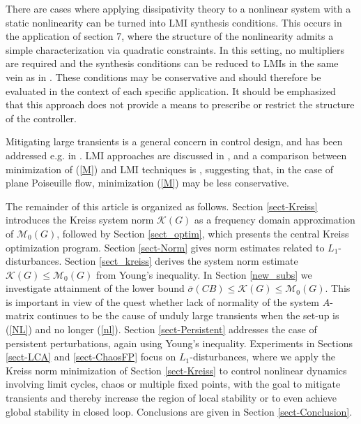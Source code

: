 \documentclass[12pt, a4paper,reqno]{amsart}
\theoremstyle{definition}
\begin{document}
There are cases where applying dissipativity theory to a nonlinear system with a static nonlinearity can be turned into LMI synthesis conditions. This occurs in the application of section 7, where the structure of the nonlinearity admits a simple characterization via quadratic constraints. In this setting, no multipliers are required and the synthesis conditions can be reduced to LMIs in the same vein as in \cite{kalur2021nonlinear,mushtaq2022feedback}. These conditions may be conservative and should therefore be evaluated in the context of each specific application. It should be emphasized that this approach does not provide a means to prescribe or restrict the structure of the controller.

Mitigating large  transients is a general concern in control design, and has been addressed e.g. in
\cite{astolfi22,whidborne2007minimization,MQMcW2011,ray21}. 
LMI approaches are discussed in \cite{boyd1994linear, whidborne2005minimization}, and  a 
comparison between minimization of (\ref{M})  and LMI techniques is \cite{quenon2021control}, suggesting that, in the case of plane Poiseuille flow, minimization (\ref{M}) may be less conservative. 





The remainder of this article is organized as follows. Section \ref{sect-Kreiss} introduces 
the Kreiss system norm $\mathcal K(G)$ as a frequency domain approximation
of $\mathcal M_0(G)$, followed by Section \ref{sect_optim}, which presents the central
Kreiss optimization program.
Section \ref{sect-Norm}  gives norm estimates related to $L_1$-disturbances. Section \ref{sect_kreiss} derives 
the system norm estimate $\mathcal K(G) \leq \mathcal M_0(G)$ from Young's inequality.
In Section \ref{new_subs} we investigate attainment of the lower bound $\overline{\sigma}(CB) \leq \mathcal K(G)\leq \mathcal M_0(G)$. This is important in view of the quest whether
lack of normality of the system $A$-matrix continues to be the cause of unduly
large transients when the set-up is (\ref{NL}) and no longer (\ref{nl}).
Section \ref{sect-Persistent} addresses the case of persistent perturbations, again using Young's inequality. Experiments
in Sections \ref{sect-LCA} and \ref{sect-ChaosFP} focus on $L_1$-disturbances, where we apply the Kreiss norm
minimization  of Section \ref{sect-Kreiss}  to control nonlinear dynamics involving limit cycles, chaos or multiple fixed points, with the goal to mitigate transients and thereby increase the region of local stability or to even achieve global stability in closed loop.
Conclusions are given in Section \ref{sect-Conclusion}. 
\end{document}
